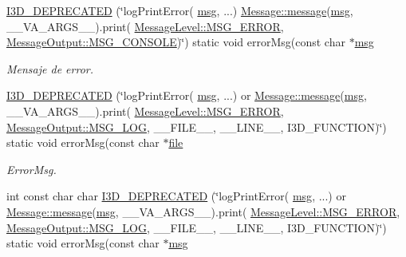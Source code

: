 \begin{DoxyCompactItemize}
\hyperlink{class_i3_d_1_1_log_msg_a45ed30b4fc9701e6cc27d6eb9b197d35}{I3\+D\+\_\+\+D\+E\+P\+R\+E\+C\+A\+T\+ED} (\char`\"{}log\+Print\+Error( \hyperlink{class_i3_d_1_1_log_msg_a5a1ceb27d9529de8eb9b3fc9377e178a}{msg}, ...) \hyperlink{class_i3_d_1_1_message_a525f877a41a1e7493188b2b720d1d254}{Message\+::message}(\hyperlink{class_i3_d_1_1_log_msg_a5a1ceb27d9529de8eb9b3fc9377e178a}{msg}, \+\_\+\+\_\+\+V\+A\+\_\+\+A\+R\+G\+S\+\_\+\+\_\+).print( \hyperlink{namespace_i3_d_a1c1740d2076e09b1a37b82e45a0327b5a5c89a276ac7877e1de49cdc1b4750ce4}{Message\+Level\+::\+M\+S\+G\+\_\+\+E\+R\+R\+OR}, \hyperlink{namespace_i3_d_a2ccb65ac6e08844c1175a235107fa103ace1cd665ada8b4f22dfa5f764fed6c6c}{Message\+Output\+::\+M\+S\+G\+\_\+\+C\+O\+N\+S\+O\+LE})\char`\"{}) static void error\+Msg(const char $\ast$\hyperlink{class_i3_d_1_1_log_msg_a5a1ceb27d9529de8eb9b3fc9377e178a}{msg}
\begin{DoxyCompactList}\small\item\em Mensaje de error. \end{DoxyCompactList}\item 
\hyperlink{class_i3_d_1_1_log_msg_a3c42ac3ea1b9ceda209394a4181394cf}{I3\+D\+\_\+\+D\+E\+P\+R\+E\+C\+A\+T\+ED} (\char`\"{}log\+Print\+Error( \hyperlink{class_i3_d_1_1_log_msg_a5a1ceb27d9529de8eb9b3fc9377e178a}{msg}, ...) or \hyperlink{class_i3_d_1_1_message_a525f877a41a1e7493188b2b720d1d254}{Message\+::message}(\hyperlink{class_i3_d_1_1_log_msg_a5a1ceb27d9529de8eb9b3fc9377e178a}{msg}, \+\_\+\+\_\+\+V\+A\+\_\+\+A\+R\+G\+S\+\_\+\+\_\+).print( \hyperlink{namespace_i3_d_a1c1740d2076e09b1a37b82e45a0327b5a5c89a276ac7877e1de49cdc1b4750ce4}{Message\+Level\+::\+M\+S\+G\+\_\+\+E\+R\+R\+OR}, \hyperlink{namespace_i3_d_a2ccb65ac6e08844c1175a235107fa103a8c1a4761ebfadb227927517230ff7b02}{Message\+Output\+::\+M\+S\+G\+\_\+\+L\+OG}, \+\_\+\+\_\+\+F\+I\+L\+E\+\_\+\+\_\+, \+\_\+\+\_\+\+L\+I\+N\+E\+\_\+\+\_\+, I3\+D\+\_\+\+F\+U\+N\+C\+T\+I\+ON)\char`\"{}) static void error\+Msg(const char $\ast$\hyperlink{class_i3_d_1_1_log_msg_ab59f20d39ef112d2196371ae0636d77c}{file}
\begin{DoxyCompactList}\small\item\em Error\+Msg. \end{DoxyCompactList}\item 
int const char char \hyperlink{class_i3_d_1_1_log_msg_a61423345a1ce5d116c573bf7e6d7e1c5}{I3\+D\+\_\+\+D\+E\+P\+R\+E\+C\+A\+T\+ED} (\char`\"{}log\+Print\+Error( \hyperlink{class_i3_d_1_1_log_msg_a5a1ceb27d9529de8eb9b3fc9377e178a}{msg}, ...) or \hyperlink{class_i3_d_1_1_message_a525f877a41a1e7493188b2b720d1d254}{Message\+::message}(\hyperlink{class_i3_d_1_1_log_msg_a5a1ceb27d9529de8eb9b3fc9377e178a}{msg}, \+\_\+\+\_\+\+V\+A\+\_\+\+A\+R\+G\+S\+\_\+\+\_\+).print( \hyperlink{namespace_i3_d_a1c1740d2076e09b1a37b82e45a0327b5a5c89a276ac7877e1de49cdc1b4750ce4}{Message\+Level\+::\+M\+S\+G\+\_\+\+E\+R\+R\+OR}, \hyperlink{namespace_i3_d_a2ccb65ac6e08844c1175a235107fa103a8c1a4761ebfadb227927517230ff7b02}{Message\+Output\+::\+M\+S\+G\+\_\+\+L\+OG}, \+\_\+\+\_\+\+F\+I\+L\+E\+\_\+\+\_\+, \+\_\+\+\_\+\+L\+I\+N\+E\+\_\+\+\_\+, I3\+D\+\_\+\+F\+U\+N\+C\+T\+I\+ON)\char`\"{}) static void error\+Msg(const char $\ast$\hyperlink{class_i3_d_1_1_log_msg_a5a1ceb27d9529de8eb9b3fc9377e178a}{msg}
\end{DoxyCompactItemize}
